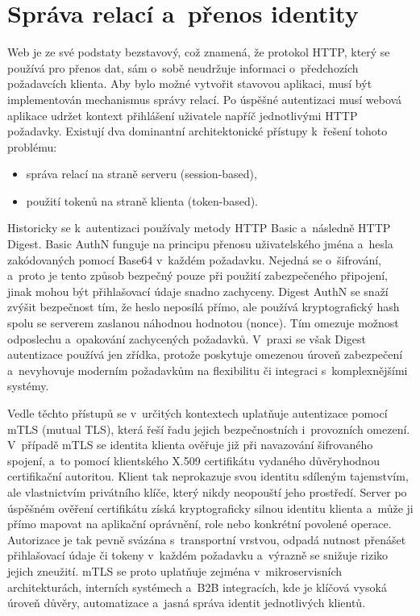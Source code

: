 \section{Správa relací a~přenos identity}
Web je ze své podstaty bezstavový, což znamená, že protokol HTTP, který se používá pro přenos dat, sám o~sobě neudržuje informaci o~předchozích požadavcích klienta.
Aby bylo možné vytvořit stavovou aplikaci, musí být implementován mechanismus správy relací.
Po úspěšné autentizaci musí webová aplikace udržet kontext přihlášení uživatele napříč jednotlivými HTTP požadavky.
Existují dva dominantní architektonické přístupy k~řešení tohoto problému:
\begin{itemize}
    \item správa relací na straně serveru (session-based),
    \item použití tokenů na straně klienta (token-based).
\end{itemize}

Historicky se k~autentizaci používaly metody HTTP Basic a~následně HTTP Digest.
Basic AuthN funguje na principu přenosu uživatelského jména a~hesla zakódovaných pomocí Base64 v~každém požadavku.
Nejedná se o~šifrování, a~proto je tento způsob bezpečný pouze při použití zabezpečeného připojení, jinak mohou být přihlašovací údaje snadno zachyceny.
Digest AuthN se snaží zvýšit bezpečnost tím, že heslo neposílá přímo, ale používá kryptografický hash spolu se serverem zaslanou náhodnou hodnotou (nonce).
Tím omezuje možnost odposlechu a~opakování zachycených požadavků.
V~praxi se však Digest autentizace používá jen zřídka, protože poskytuje omezenou úroveň zabezpečení a~nevyhovuje moderním požadavkům na flexibilitu či integraci s~komplexnějšími systémy.

Vedle těchto přístupů se v~určitých kontextech uplatňuje autentizace pomocí mTLS (mutual TLS), která řeší řadu jejich bezpečnostních i~provozních omezení.
V~případě mTLS se identita klienta ověřuje již při navazování šifrovaného spojení, a~to pomocí klientského X.509 certifikátu vydaného důvěryhodnou certifikační autoritou.
Klient tak neprokazuje svou identitu sdíleným tajemstvím, ale vlastnictvím privátního klíče, který nikdy neopouští jeho prostředí.
Server po úspěšném ověření certifikátu získá kryptograficky silnou identitu klienta a~může ji přímo mapovat na aplikační oprávnění, role nebo konkrétní povolené operace.
Autorizace je tak pevně svázána s~transportní vrstvou, odpadá nutnost přenášet přihlašovací údaje či tokeny v~každém požadavku a~výrazně se snižuje riziko jejich zneužití.
mTLS se proto uplatňuje zejména v~mikroservisních architekturách, interních systémech a~B2B integracích, kde je klíčová vysoká úroveň důvěry, automatizace a~jasná správa identit jednotlivých klientů.


